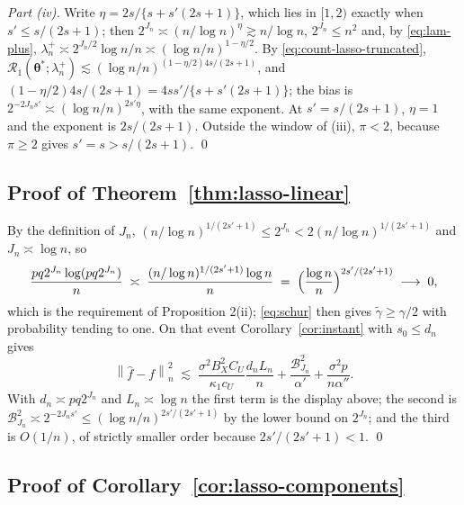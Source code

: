 \documentclass[10pt]{book}
\theoremstyle{definition}
\newcommand{\normn}[1]{\left\lVert #1 \right\rVert_{n}}
\newcommand{\btheta}{\boldsymbol{\theta}}
\newcommand{\thetastar}{\btheta^{*}}
\newcommand{\penn}{\lambda_{n}}
\newcommand{\seff}{s'}
\newcommand{\gtil}{\widetilde{\gamma}}
\newcommand{\Rone}{\mathcal{R}_{1}}
\begin{document}
{\emph{Part (iv).} Write $\eta = 2s/\{s+\seff(2s+1)\}$, which lies in $[1,2)$
exactly when $\seff \le s/(2s+1)$; then $2^{J_n} \asymp (n/\log n)^{\eta}
\gtrsim n/\log n$, $2^{J_n} \le n^{2}$ and, by \eqref{eq:lam-plus},
$\penn^{+} \asymp 2^{J_n/2}\log n/n \asymp (\log n/n)^{1-\eta/2}$. By
\eqref{eq:count-lasso-truncated}, $\Rone(\thetastar;\penn^{+}) \lesssim
(\log n/n)^{(1-\eta/2)4s/(2s+1)}$, and $(1-\eta/2)4s/(2s+1) =
4s\seff/\{s+\seff(2s+1)\}$; the bias is $2^{-2J_n\seff} \asymp
(\log n/n)^{2\seff\eta}$, with the same exponent. At $\seff = s/(2s+1)$,
$\eta = 1$ and the exponent is $2s/(2s+1)$. Outside the window of (iii),
$\pi < 2$, because $\pi \ge 2$ gives $\seff = s > s/(2s+1)$. \qed

\subsection*{Proof of Theorem~\ref{thm:lasso-linear}}

By the definition of $J_n$,
$(n/\log n)^{1/(2\seff+1)} \le 2^{J_n} < 2(n/\log n)^{1/(2\seff+1)}$ and
$J_n \asymp \log n$, so
\[
  \frac{pq2^{J_n}\log(pq2^{J_n})}{n}
  \;\asymp\; \frac{(n/\log n)^{1/(2\seff+1)}\log n}{n}
  \;=\; \Bigl(\frac{\log n}{n}\Bigr)^{2\seff/(2\seff+1)}
  \;\longrightarrow\; 0,
\]
which is the requirement of Proposition 2(ii); \eqref{eq:schur} then gives
$\gtil \ge \gamma/2$ with probability tending to one. On that event
Corollary~\ref{cor:instant} with $s_0 \le d_n$ gives
\[
  \normn{\widehat{f}-f}^2 \;\lesssim\;
  \frac{\sigma^2B_X^2C_U}{\kappa_1c_U}\frac{d_nL_n}{n}
  + \frac{\mathcal{B}^2_{J_n}}{\alpha'} + \frac{\sigma^2p}{n\alpha''} .
\]
With $d_n \asymp pq2^{J_n}$ and $L_n \asymp \log n$ the first term is the
display above; the second is
$\mathcal{B}^2_{J_n} \asymp 2^{-2J_n\seff} \le
(\log n/n)^{2\seff/(2\seff+1)}$ by the lower bound on $2^{J_n}$; and the third
is $O(1/n)$, of strictly smaller order because $2\seff/(2\seff+1)<1$. \qed

\subsection*{Proof of Corollary~\ref{cor:lasso-components}}

}
\end{document}

